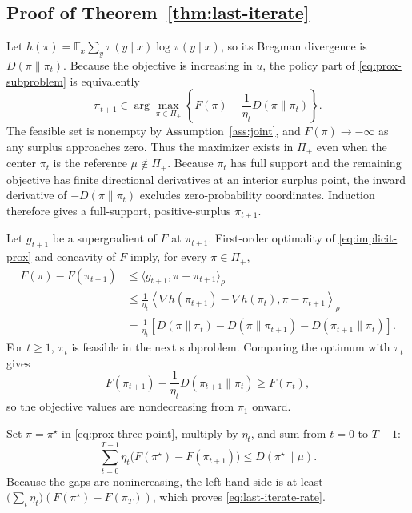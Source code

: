 \documentclass{article}
\theoremstyle{remark}
\theoremstyle{plain}
\newcommand{\E}{\mathbb{E}}
\begin{document}
\subsection{Proof of Theorem~\ref{thm:last-iterate}}
\label{app:convergence}
Let $h(\pi)=\E_x\sum_y\pi(y\mid x)\log\pi(y\mid x)$, so its Bregman divergence is $D(\pi\|\pi_t)$. Because the objective is increasing in $u$, the policy part of \eqref{eq:prox-subproblem} is equivalently
\begin{equation}
\pi_{t+1}
\in
\arg\max_{\pi\in\Pi_+}
\left\{F(\pi)-\frac1{\eta_t}D(\pi\|\pi_t)\right\}.
\label{eq:implicit-prox}
\end{equation}
The feasible set is nonempty by Assumption~\ref{ass:joint}, and $F(\pi)\to-\infty$ as any surplus approaches zero. Thus the maximizer exists in $\Pi_+$ even when the center $\pi_t$ is the reference $\mu\notin\Pi_+$. Because $\pi_t$ has full support and the remaining objective has finite directional derivatives at an interior surplus point, the inward derivative of $-D(\pi\|\pi_t)$ excludes zero-probability coordinates. Induction therefore gives a full-support, positive-surplus $\pi_{t+1}$.

Let $g_{t+1}$ be a supergradient of $F$ at $\pi_{t+1}$. First-order optimality of \eqref{eq:implicit-prox} and concavity of $F$ imply, for every $\pi\in\Pi_+$,
\begin{align}
F(\pi)-F(\pi_{t+1})
&\le \langle g_{t+1},\pi-\pi_{t+1}\rangle_\rho\\
&\le\frac1{\eta_t}
\left\langle\nabla h(\pi_{t+1})-\nabla h(\pi_t),
\pi-\pi_{t+1}\right\rangle_\rho\\
&=\frac1{\eta_t}
\left[
D(\pi\|\pi_t)-D(\pi\|\pi_{t+1})-D(\pi_{t+1}\|\pi_t)
\right].
\label{eq:prox-three-point}
\end{align}
For $t\ge1$, $\pi_t$ is feasible in the next subproblem. Comparing the optimum with $\pi_t$ gives
\begin{equation}
F(\pi_{t+1})-\frac{1}{\eta_t}D(\pi_{t+1}\|\pi_t)
\ge F(\pi_t),
\label{eq:prox-monotone}
\end{equation}
so the objective values are nondecreasing from $\pi_1$ onward.

Set $\pi=\pi^\star$ in \eqref{eq:prox-three-point}, multiply by $\eta_t$, and sum from $t=0$ to $T-1$:
\begin{equation}
\sum_{t=0}^{T-1}\eta_t
\big(F(\pi^\star)-F(\pi_{t+1})\big)
\le
D(\pi^\star\|\mu).
\label{eq:prox-telescope}
\end{equation}
Because the gaps are nonincreasing, the left-hand side is at least
$\big(\sum_t\eta_t\big)(F(\pi^\star)-F(\pi_T))$, which proves \eqref{eq:last-iterate-rate}.
\end{document}
